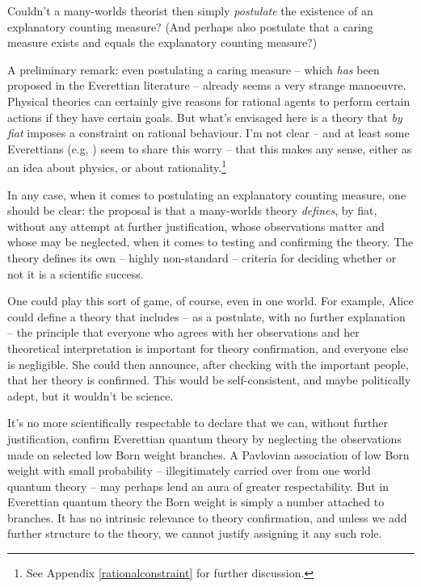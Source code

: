 \documentclass[aps,
pra,epsfig]{revtex4}
\begin{document}
Couldn't a many-worlds theorist then simply {\it postulate}
the existence of an explanatory counting measure?   (And perhaps also  
postulate that a caring measure exists and equals the explanatory
counting measure?) 

A preliminary remark: even postulating a caring measure -- which 
{\it has} been 
proposed\cite{papineauvol} in the Everettian literature -- already
seems a very strange manoeuvre.  Physical theories can certainly give 
reasons for rational agents to perform certain actions if they
have certain goals.   But what's envisaged here is a theory
that {\it by fiat} imposes a constraint on rational behaviour.  I'm 
not clear -- and at least some Everettians (e.g. \cite{saundersvol})
seem to share this worry -- 
that this makes any sense, either as an idea about
physics, or about rationality.\footnote{See Appendix \ref{rationalconstraint}
for further discussion.}

In any case, when it comes to postulating an explanatory
counting measure, one should be clear: the proposal is  
that a many-worlds theory {\it defines}, by fiat, without any attempt
at further justification, whose observations matter and whose may
be neglected, when it comes to testing and confirming the theory.  
The theory defines its own -- highly 
non-standard -- criteria for deciding whether or not it is
a scientific success.  

One could play this sort of game, of course, even in one world.  
For example,
Alice could define a theory that includes -- as a postulate, with no further 
explanation -- the principle that everyone who agrees 
with her observations and her theoretical interpretation is important
for theory confirmation, and everyone else is negligible.   
She could then announce, after checking with the important people, that 
her theory is confirmed.
This would be self-consistent, and maybe politically adept, but it 
wouldn't be science.  

It's no more scientifically respectable to declare that we can, without
further justification, confirm Everettian quantum theory by 
neglecting the observations made on selected low Born weight branches.
A Pavlovian association of low Born weight 
with small probability --  illegitimately carried
over from one world quantum theory -- may perhaps lend an
aura of greater respectability.   
But in Everettian quantum theory the Born weight is 
simply a number attached to branches.  
It has no intrinsic relevance to theory confirmation, and unless we add 
further structure to the theory, we cannot justify assigning it any such 
role.   
\end{document}
